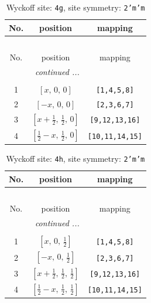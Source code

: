 \documentclass[fleqn,8pt]{jsarticle}
\begin{document}
\renewcommand{\arraystretch}{1.2}
\begin{longtable}{ccc}
\caption{Wyckoff site: {\tt 4g}, site symmetry: {\tt 2'm'm}}
 \\
 \hline \hline
No. & position & mapping \\ \hline \endfirsthead

\multicolumn{2}{l}{\tablename\ \thetable{}} \\
 \hline \hline
No. & position & mapping \\ \hline \endhead

 \hline \hline
\multicolumn{2}{r}{\footnotesize\it continued ...} \\ \endfoot

 \hline \hline
\multicolumn{2}{r}{} \\ \endlastfoot

1 & $\left[ x,\, 0,\, 0 \right]$ & {\tt [1,4,5,8]} \\ \hline
2 & $\left[ - x,\, 0,\, 0 \right]$ & {\tt [2,3,6,7]} \\ \hline
3 & $\left[ x + \frac{1}{2},\, \frac{1}{2},\, 0 \right]$ & {\tt [9,12,13,16]} \\ \hline
4 & $\left[ \frac{1}{2} - x,\, \frac{1}{2},\, 0 \right]$ & {\tt [10,11,14,15]} \\
\end{longtable}
\renewcommand{\arraystretch}{1.2}
\begin{longtable}{ccc}
\caption{Wyckoff site: {\tt 4h}, site symmetry: {\tt 2'm'm}}
 \\
 \hline \hline
No. & position & mapping \\ \hline \endfirsthead

\multicolumn{2}{l}{\tablename\ \thetable{}} \\
 \hline \hline
No. & position & mapping \\ \hline \endhead

 \hline \hline
\multicolumn{2}{r}{\footnotesize\it continued ...} \\ \endfoot

 \hline \hline
\multicolumn{2}{r}{} \\ \endlastfoot

1 & $\left[ x,\, 0,\, \frac{1}{2} \right]$ & {\tt [1,4,5,8]} \\ \hline
2 & $\left[ - x,\, 0,\, \frac{1}{2} \right]$ & {\tt [2,3,6,7]} \\ \hline
3 & $\left[ x + \frac{1}{2},\, \frac{1}{2},\, \frac{1}{2} \right]$ & {\tt [9,12,13,16]} \\ \hline
4 & $\left[ \frac{1}{2} - x,\, \frac{1}{2},\, \frac{1}{2} \right]$ & {\tt [10,11,14,15]} \\
\end{longtable}
\end{document}

